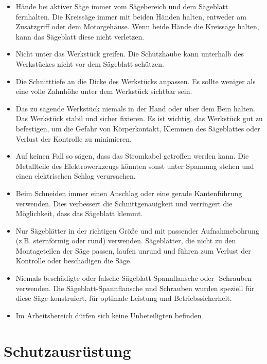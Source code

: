 \documentclass{\basedir/fablab-document}
\begin{document}
\begin{itemize}
\item Hände bei aktiver Säge immer vom Sägebereich und dem Sägeblatt fernhalten. Die Kreissäge immer mit beiden Händen halten, entweder am Zusatzgriff oder dem Motorgehäuse. Wenn beide Hände die Kreissäge halten, kann das Sägeblatt diese nicht verletzen.

\item Nicht unter das Werkstück greifen. Die Schutzhaube kann unterhalb des Werkstückes nicht vor dem Sägeblatt schützen.

\item Die Schnitttiefe an die Dicke des Werkstücks anpassen. Es sollte weniger als eine volle Zahnhöhe unter dem Werkstück sichtbar sein.

\item Das zu sägende Werkstück niemals in der Hand oder über dem Bein halten. Das Werkstück stabil und sicher fixieren. Es ist wichtig, das Werkstück gut zu befestigen,
um die Gefahr von Körperkontakt, Klemmen des Sägeblattes oder Verlust der Kontrolle zu minimieren.

\item Auf keinen Fall so sägen, dass das Stromkabel getroffen werden kann. Die Metallteile des Elektrowerkzeugs könnten sonst unter Spannung stehen und einen elektrischen Schlag verursachen.

\item Beim Schneiden immer einen Anschlag oder eine gerade Kantenführung verwenden. Dies verbessert die Schnittgenauigkeit und verringert die Möglichkeit, dass das Sägeblatt klemmt.

\item Nur Sägeblätter in der richtigen Größe und mit passender Aufnahmebohrung (z.B. sternförmig oder rund) verwenden. Sägeblätter, die nicht zu den Montageteilen der Säge passen, laufen unrund und führen zum Verlust der Kontrolle oder beschädigen die Säge.

\item Niemals beschädigte oder falsche Sägeblatt-Spannflansche oder -Schrauben verwenden. Die Sägeblatt-Spannflansche und Schrauben wurden speziell für diese Säge konstruiert, für optimale Leistung und Betriebssicherheit.

\item Im Arbeitsbereich dürfen sich keine Unbeteiligten befinden
\end{itemize}


\section{Schutzausrüstung}
\end{document}
